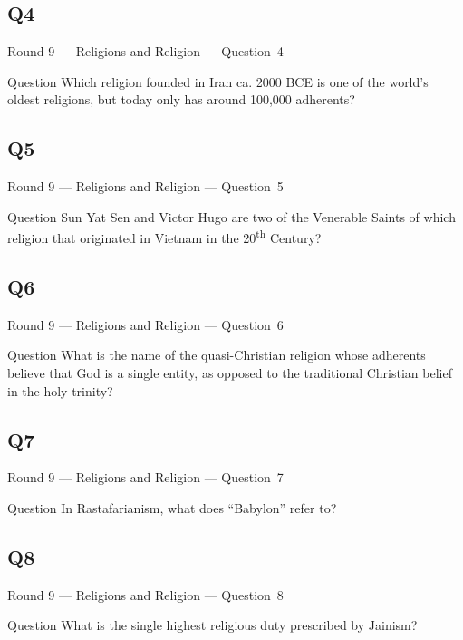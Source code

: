 \documentclass[11pt]{beamer}
\begin{document}
\subsection*{Q4}
\begin{frame}[t]{Round 9 --- Religions and Religion --- \mbox{Question 4}}
\vspace{-0.5em}
\begin{block}{Question}
Which religion founded in Iran ca. 2000 BCE is one of the world's oldest religions, but today only has around 100,000 adherents?
\end{block}
\end{frame}
\subsection*{Q5}
\begin{frame}[t]{Round 9 --- Religions and Religion --- \mbox{Question 5}}
\vspace{-0.5em}
\begin{block}{Question}
Sun Yat Sen and Victor Hugo are two of the Venerable Saints of which religion that originated in Vietnam in the 20\textsuperscript{th} Century?
\end{block}
\end{frame}
\subsection*{Q6}
\begin{frame}[t]{Round 9 --- Religions and Religion --- \mbox{Question 6}}
\vspace{-0.5em}
\begin{block}{Question}
What is the name of the quasi-Christian religion whose adherents believe that God is a single entity, as opposed to the traditional Christian belief in the holy trinity?
\end{block}
\end{frame}
\subsection*{Q7}
\begin{frame}[t]{Round 9 --- Religions and Religion --- \mbox{Question 7}}
\vspace{-0.5em}
\begin{block}{Question}
In Rastafarianism, what does ``Babylon'' refer to?
\end{block}
\end{frame}
\subsection*{Q8}
\begin{frame}[t]{Round 9 --- Religions and Religion --- \mbox{Question 8}}
\vspace{-0.5em}
\begin{block}{Question}
What is the single highest religious duty prescribed by Jainism?
\end{block}
\end{frame}
\end{document}
